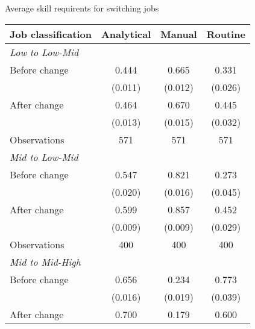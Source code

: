 \begin{center}
\begin{threeparttable}[!h]
\caption{Average skill requirents for switching jobs}
\begin{tabular}{lccc}
\toprule
\toprule
\textbf{Job classification}&\multicolumn{1}{c}{\textbf{Analytical}}&\multicolumn{1}{c}{\textbf{Manual}}&\multicolumn{1}{c}{\textbf{Routine}} \\
\midrule
\textit{Low to Low-Mid} \\
\hspace{3mm}Before change&       0.444\sym{***}&       0.665\sym{***}&       0.331\sym{***}\\
                    &     (0.011)         &     (0.012)         &     (0.026)         \\
\hspace{3mm}After change&       0.464\sym{***}&       0.670\sym{***}&       0.445\sym{***}\\
                    &     (0.013)         &     (0.015)         &     (0.032)         \\
Observations        &         571         &         571         &         571         \\
\midrule\textit{Mid to Low-Mid} \\
\hspace{3mm}Before change&       0.547\sym{***}&       0.821\sym{***}&       0.273\sym{***}\\
                    &     (0.020)         &     (0.016)         &     (0.045)         \\
\hspace{3mm}After change&       0.599\sym{***}&       0.857\sym{***}&       0.452\sym{***}\\
                    &     (0.009)         &     (0.009)         &     (0.029)         \\
Observations        &         400         &         400         &         400         \\
\midrule\textit{Mid to Mid-High} \\
\hspace{3mm}Before change&       0.656\sym{***}&       0.234\sym{***}&       0.773\sym{***}\\
                    &     (0.016)         &     (0.019)         &     (0.039)         \\
\hspace{3mm}After change&       0.700\sym{***}&       0.179\sym{***}&       0.600\sym{***}\\

\end{tabular}
\end{threeparttable}
\end{center}
